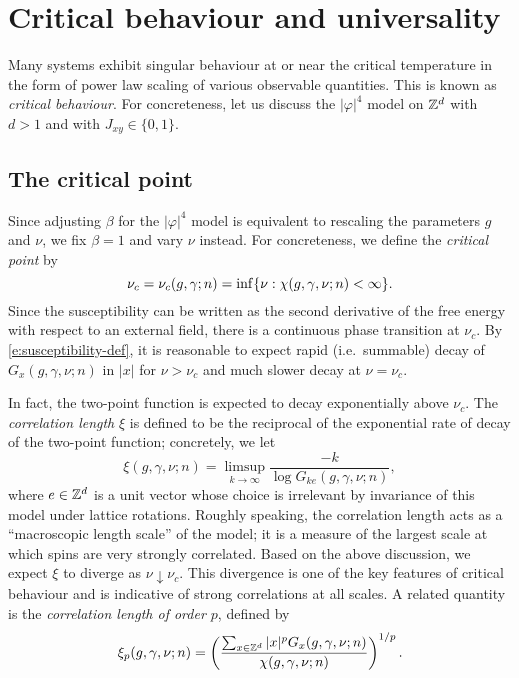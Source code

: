 \section{Critical behaviour and universality}

Many systems exhibit singular behaviour at or near the critical temperature in
the form of power law scaling of various observable quantities. This is known as
\emph{critical behaviour}. For concreteness, let us discuss the $|\varphi|^4$ model
on ${ {{\mathbb Z}}^d }$ with $d > 1$ and with $J_{xy} \in \{ 0, 1 \}$.


\subsection{The critical point}

Since adjusting $\beta$ for the $|\varphi|^4$ model is equivalent to rescaling the
parameters $g$ and $\nu$, we fix $\beta = 1$ and vary $\nu$ instead.
For concreteness, we define the \emph{critical point} by
\begin{equation}
\label{}
\nu_c = \nu_c(g, \gamma; n) = \inf \{ \nu : \chi(g, \gamma, \nu; n) < \infty \}.
\end{equation}
Since the susceptibility can be written as the second derivative of the free energy
with respect to an external field, there is a continuous phase transition at $\nu_c$.
By \eqref{e:susceptibility-def}, it is
reasonable to expect rapid (i.e.\ summable) decay of $G_x(g, \gamma, \nu; n)$ in $|x|$ for
$\nu > \nu_c$ and much slower decay at $\nu = \nu_c$.

In fact, the two-point function is expected to decay exponentially above $\nu_c$.
The \emph{correlation length} $\xi$ is defined to be the reciprocal of the exponential
rate of decay of the two-point function; concretely, we let
\begin{equation}
\xi(g, \gamma, \nu; n) = \limsup_{k\to\infty} \frac{-k}{\log G_{ke}(g, \gamma, \nu; n)},
\end{equation}
where $e \in { {{\mathbb Z}}^d }$ is a unit vector whose choice is irrelevant by invariance of this model
under lattice rotations.
Roughly speaking, the correlation length acts as
a ``macroscopic length scale'' of the model; it is a measure of the largest scale at
which spins are very strongly correlated. Based on the above discussion, we expect $\xi$
to diverge as $\nu\downarrow\nu_c$. This divergence is one of the
key features of critical behaviour and is indicative of strong correlations at all
scales. A related quantity is the \emph{correlation length of order $p$}, defined by
\begin{equation}
\label{e:clp-spins}
\xi_p(g, \gamma, \nu; n)
	=
\left(\frac{\sum_{x\in{ {{\mathbb Z}}^d }} |x|^p G_x(g, \gamma, \nu; n)}{\chi(g, \gamma, \nu; n)}\right)^{1/p}.
\end{equation}

